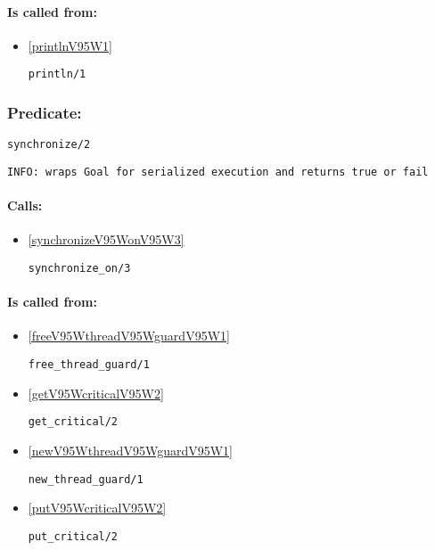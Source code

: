 \paragraph{Is called from:} 
\begin{itemize}
\item \ref{printlnV95W1} 
\begin{verbatim}
println/1
\end{verbatim}

\end{itemize}

\subsubsection{Predicate:} \label{synchronizeV95W2}

\begin{verbatim}
synchronize/2
\end{verbatim}

{\small \begin{verbatim}
INFO: wraps Goal for serialized execution and returns true or fail

\end{verbatim}}
\paragraph{Calls:} 
\begin{itemize}
\item \ref{synchronizeV95WonV95W3} 
\begin{verbatim}
synchronize_on/3
\end{verbatim}

\end{itemize}
\paragraph{Is called from:} 
\begin{itemize}
\item \ref{freeV95WthreadV95WguardV95W1} 
\begin{verbatim}
free_thread_guard/1
\end{verbatim}

\item \ref{getV95WcriticalV95W2} 
\begin{verbatim}
get_critical/2
\end{verbatim}

\item \ref{newV95WthreadV95WguardV95W1} 
\begin{verbatim}
new_thread_guard/1
\end{verbatim}

\item \ref{putV95WcriticalV95W2} 
\begin{verbatim}
put_critical/2
\end{verbatim}

\end{itemize}

